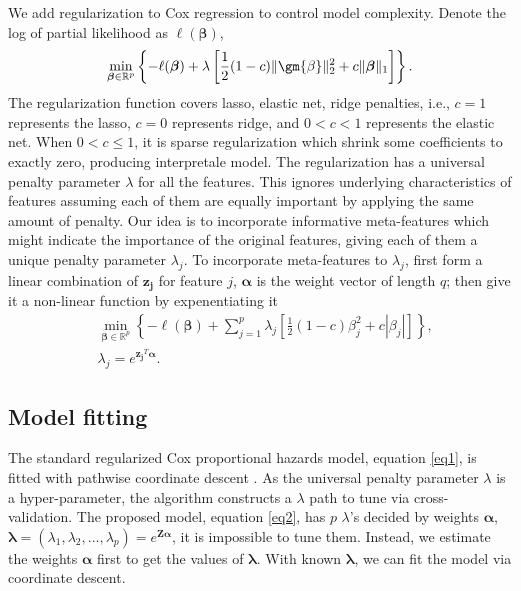 \documentclass[12pt]{article}
\begin{document}
We add regularization to Cox regression to control model complexity. Denote the log of partial likelihood as $\ell(\bm{\beta})$,
\begin{equation} \label{eq1}
    \min_{\bm{\beta}\in \mathbb{R}^p} \left\{-\ell(\bm{\beta}) + \lambda\left[\frac{1}{2}(1-c)\|\gm{\beta}\|_2^2 + c\|\bm{\beta}\|_1\right]\right\}.
\end{equation}
The regularization function covers lasso, elastic net, ridge penalties, i.e., $c=1$ represents the lasso, $c=0$ represents ridge, and $0<c<1$ represents the elastic net. When $0<c\leq1$, it is sparse regularization which shrink some coefficients to exactly zero, producing interpretale model. The regularization has a universal penalty parameter $\lambda$ for all the features. This ignores underlying characteristics of features assuming each of them are equally important by applying the same amount of penalty. Our idea is to incorporate informative meta-features which might indicate the importance of the original features, giving each of them a unique penalty parameter $\lambda_j$. To incorporate meta-features to $\lambda_j$, first form a linear combination of $\bm{z_j}$ for feature $j$, $\bm{\alpha}$ is the weight vector of length $q$; then give it a non-linear function by expenentiating it
\begin{equation} \label{eq2}
\begin{aligned}
    &\min_{\bm{\beta}\in \mathbb{R}^p} \left\{-\ell(\bm{\beta}) + \sum_{j=1}^p \lambda_j\left[\frac{1}{2}(1-c)\beta_j^2 + c|\beta_j|\right]\right\}, \\
    &\lambda_j = e^{\bm{z_j}^T \bm{\alpha}}.
\end{aligned}
\end{equation}

\subsection{Model fitting}
The standard regularized Cox proportional hazards model, equation \eqref{eq1}, is fitted with pathwise coordinate descent \citep{simon2011regularization}. As the universal penalty parameter $\lambda$ is a hyper-parameter, the algorithm constructs a $\lambda$ path to tune via cross-validation. The proposed model, equation \eqref{eq2}, has $p$ $\lambda$'s decided by weights $\bm{\alpha}$, $\bm{\lambda} = (\lambda_1,\lambda_2,\dots,\lambda_p) = e^{\bm{Z\alpha}}$, it is impossible to tune them. Instead, we estimate the weights $\bm{\alpha}$ first to get the values of $\bm{\lambda}$. With known $\bm{\lambda}$, we can fit the model via coordinate descent.
\end{document}
